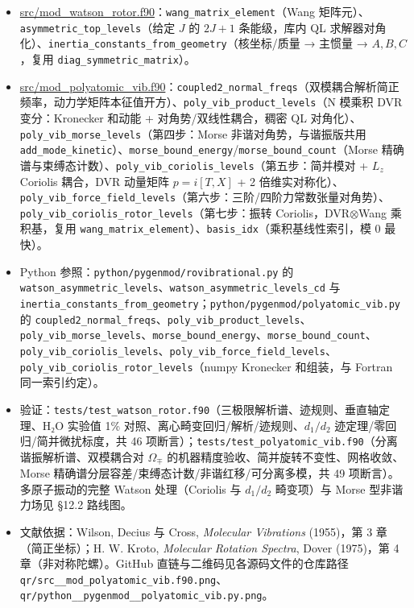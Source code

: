 \documentclass[
]{ctexbook}
\providecommand{\tightlist}{%
  \setlength{\itemsep}{0pt}\setlength{\parskip}{0pt}}
\begin{document}
\begin{itemize}
\tightlist
\item
  \href{https://github.com/l1Ha/QuantumGeneralModule/blob/main/src/mod_watson_rotor.f90}{src/mod\_watson\_rotor.f90}：\texttt{wang\_matrix\_element}（Wang
  矩阵元）、\texttt{asymmetric\_top\_levels}（给定 \(J\) 的 \(2J+1\)
  条能级，库内 QL
  求解器对角化）、\texttt{inertia\_constants\_from\_geometry}（核坐标/质量
  → 主惯量 → \(A,B,C\)，复用 \texttt{diag\_symmetric\_matrix}）。
\item
  \href{https://github.com/l1Ha/QuantumGeneralModule/blob/main/src/mod_polyatomic_vib.f90}{src/mod\_polyatomic\_vib.f90}：\texttt{coupled2\_normal\_freqs}（双模耦合解析简正频率，动力学矩阵本征值开方）、\texttt{poly\_vib\_product\_levels}（N
  模乘积 DVR 变分：Kronecker 和动能 + 对角势/双线性耦合，稠密 QL
  对角化）、\texttt{poly\_vib\_morse\_levels}（第四步：Morse
  非谐对角势，与谐振版共用
  \texttt{add\_mode\_kinetic}）、\texttt{morse\_bound\_energy}/\texttt{morse\_bound\_count}（Morse
  精确谱与束缚态计数）、\texttt{poly\_vib\_coriolis\_levels}（第五步：简并模对
  + \(L_z\) Coriolis 耦合，DVR 动量矩阵 \(p=i[T,X]\) + 2
  倍维实对称化）、\texttt{poly\_vib\_force\_field\_levels}（第六步：三阶/四阶力常数张量对角势）、\texttt{poly\_vib\_coriolis\_rotor\_levels}（第七步：振转
  Coriolis，DVR\(\otimes\)Wang 乘积基，复用
  \texttt{wang\_matrix\_element}）、\texttt{basis\_idx}（乘积基线性索引，模
  0 最快）。
\item
  Python 参照：\texttt{python/pygenmod/rovibrational.py} 的
  \texttt{watson\_asymmetric\_levels}、\texttt{watson\_asymmetric\_levels\_cd}
  与
  \texttt{inertia\_constants\_from\_geometry}；\texttt{python/pygenmod/polyatomic\_vib.py}
  的
  \texttt{coupled2\_normal\_freqs}、\texttt{poly\_vib\_product\_levels}、\texttt{poly\_vib\_morse\_levels}、\texttt{morse\_bound\_energy}、\texttt{morse\_bound\_count}、\texttt{poly\_vib\_coriolis\_levels}、\texttt{poly\_vib\_force\_field\_levels}、\texttt{poly\_vib\_coriolis\_rotor\_levels}（numpy
  Kronecker 和组装，与 Fortran 同一索引约定）。
\item
  验证：\texttt{tests/test\_watson\_rotor.f90}（三极限解析谱、迹规则、垂直轴定理、H₂O
  实验值 1\% 对照、离心畸变回归/解析/迹规则、\(d_1/d_2\)
  迹定理/零回归/简并微扰标度，共 46
  项断言）；\texttt{tests/test\_polyatomic\_vib.f90}（分离谐振解析谱、双模耦合对
  \(\Omega_\mp\) 的机器精度验收、简并旋转不变性、网格收敛、Morse
  精确谱分层容差/束缚态计数/非谐红移/可分离多模，共 49
  项断言）。多原子振动的完整 Watson 处理（Coriolis 与 \(d_1/d_2\)
  畸变项）与 Morse 型非谐力场见 §12.2 路线图。
\item
  文献依据：Wilson, Decius 与 Cross, \emph{Molecular Vibrations}
  (1955)，第 3 章（简正坐标）；H. W. Kroto, \emph{Molecular Rotation
  Spectra}, Dover (1975)，第 4 章（非对称陀螺）。GitHub
  直链与二维码见各源码文件的仓库路径
  \texttt{qr/src\_\_mod\_polyatomic\_vib.f90.png}、\texttt{qr/python\_\_pygenmod\_\_polyatomic\_vib.py.png}。
\end{itemize}
\end{document}
